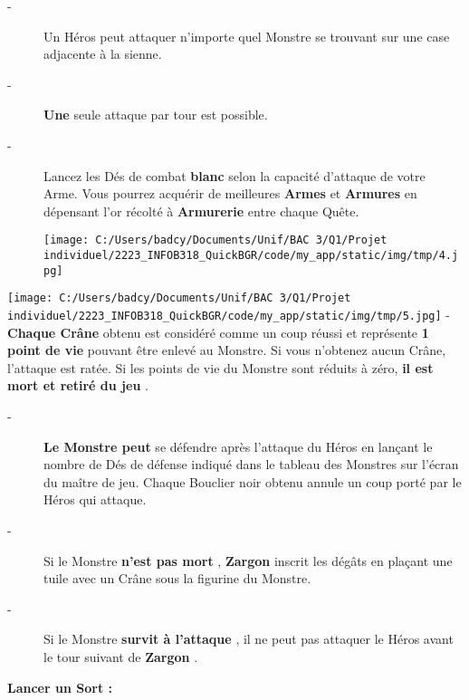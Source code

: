 \documentclass{scrartcl}%
\begin{document}
%
\begin{description}%
\item[{-} ]%
%
 Un Héros peut attaquer n’importe quel Monstre se trouvant sur une case adjacente à la sienne.
%
\item[{-} ]%
%
\textcolor{mygreen}{%
\textbf{Une}%
}%
\textit{ }%
 seule attaque par tour est possible.
%
\item[{-} ]%
%
 Lancez les Dés de combat %
\textcolor{mygreen}{%
\textbf{blanc}%
}%
\textit{ }%
 selon la capacité d'attaque de votre Arme. Vous pourrez acquérir de meilleures%
\textcolor{mygreen}{%
\textbf{ Armes}%
}%
\textit{ }%
 et %
\textcolor{mygreen}{%
\textbf{Armures}%
}%
\textit{ }%
 en dépensant l'or récolté à %
\textcolor{mygreen}{%
\textbf{Armurerie}%
}%
\textit{ }%
 entre chaque Quête.%
\begin{center}\texttt{[image: C:/Users/badcy/Documents/Unif/BAC 3/Q1/Projet individuel/2223\_INFOB318\_QuickBGR/code/my\_app/static/img/tmp/4.jpg]}\end{center}%

%
\end{description}%
%
\texttt{[image: C:/Users/badcy/Documents/Unif/BAC 3/Q1/Projet individuel/2223\_INFOB318\_QuickBGR/code/my\_app/static/img/tmp/5.jpg]}%
{-} %
\textcolor{mygreen}{%
\textbf{Chaque Crâne}%
}%
\textit{ }%
 obtenu est considéré comme un coup réussi et représente %
\textcolor{mygreen}{%
\textbf{1 point de vie}%
}%
\textit{ }%
 pouvant être enlevé au Monstre. Si vous n’obtenez aucun Crâne, l'attaque est ratée. Si les points de vie du Monstre sont réduits à zéro,%
\textcolor{mygreen}{%
\textbf{ il est mort et retiré du jeu}%
}%
.
%
\begin{description}%
\item[{-} ]%
%
\textcolor{mygreen}{%
\textbf{Le Monstre peut}%
}%
\textit{ }%
 se défendre après l’attaque du Héros en lançant le nombre de Dés de défense indiqué dans le tableau des Monstres sur l'écran du maître de jeu. Chaque Bouclier noir obtenu annule un coup porté par le Héros qui attaque.
%
\item[{-} ]%
%
 Si le Monstre%
\textcolor{mygreen}{%
\textbf{ n'est pas mort}%
}%
, %
\textcolor{mygreen}{%
\textbf{Zargon}%
}%
inscrit les dégâts en plaçant une tuile avec un Crâne sous la figurine du Monstre.
%
\item[{-} ]%
%
 Si le Monstre %
\textcolor{mygreen}{%
\textbf{survit à l'attaque}%
}%
, il ne peut pas attaquer le Héros avant le tour suivant de%
\textcolor{mygreen}{%
\textbf{ Zargon}%
}%
. 
%
\end{description}%
\textcolor{mygreen}{%
\textbf{Lancer un Sort :}%
}%
\end{document}
